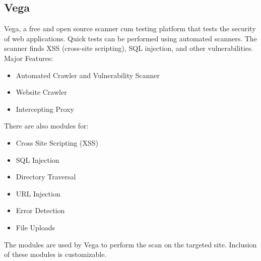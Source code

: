 \subsection{Vega}
Vega, a free and open source scanner cum testing platform that tests the security of web applications. Quick tests can be performed using automated scanners. The scanner finds XSS (cross-site scripting), SQL injection, and other vulnerabilities. \\

Major Features:
\begin{itemize}
    \item Automated Crawler and Vulnerability Scanner
    \item Website Crawler
    \item Intercepting Proxy
\end{itemize}

There are also modules for:
\begin{itemize}
    \item Cross Site Scripting (XSS)
    \item SQL Injection
    \item Directory Traversal
    \item URL Injection
    \item Error Detection
    \item File Uploads
\end{itemize}

The modules are used by Vega to perform the scan on the targeted site. Inclusion of these modules is customizable.